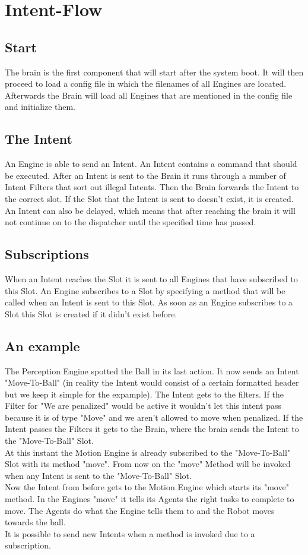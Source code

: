 \documentclass[12pt,a4paper]{article}
\begin{document}
\section{Intent-Flow}\label{sec:intent-flow}
\subsection{Start}\label{subsec:start}
The brain is the first component that will start after the system boot.
It will then proceed to load a config file in which the filenames of all Engines are located.
Afterwards the Brain will load all Engines that are mentioned in the config file and initialize them.
\subsection{The Intent}\label{subsec:theIntent}
An Engine is able to send an Intent.
An Intent contains a command that should be executed.
After an Intent is sent to the Brain it runs through a number of Intent Filters that sort out illegal Intents.
Then the Brain forwards the Intent to the correct slot.
If the Slot that the Intent is sent to doesn't exist,
it is created.
An Intent can also be delayed, which means that after reaching the brain it will
not continue on to the dispatcher until the specified time has passed.
\subsection{Subscriptions}\label{subsec:subscriptions}
When an Intent reaches the Slot it is sent to all Engines that have subscribed to this Slot.
An Engine subscribes to a Slot by specifying a method that will be called when an Intent is sent to this Slot.
As soon as an Engine subscribes to a Slot this Slot is created if it didn't exist before.
\subsection{An example}\label{subsec:anExample}
The Perception Engine spotted the Ball in its last action.
It now sends an Intent "Move-To-Ball"
(in reality the Intent would consist of a certain formatted header but we keep it simple for the expample).
The Intent gets to the filters.
If the Filter for "We are penalized" would be active it wouldn't let this intent pass
because it is of type "Move" and we aren't allowed to move when penalized.
If the Intent passes the Filters it gets to the Brain, where the brain sends the Intent to the "Move-To-Ball" Slot.
\\
At this instant the Motion Engine is already subscribed to the "Move-To-Ball" Slot with its method "move".
From now on the "move" Method will be invoked when any Intent is sent to the "Move-To-Ball" Slot.
\\
Now the Intent from before gets to the Motion Engine which starts its "move" method.
In the Engines "move" it tells its Agents the right tasks to complete to move.
The Agents do what the Engine tells them to and the Robot moves towards the ball.
\\
It is possible to send new Intents when a method is invoked due to a subscription.
\end{document}
